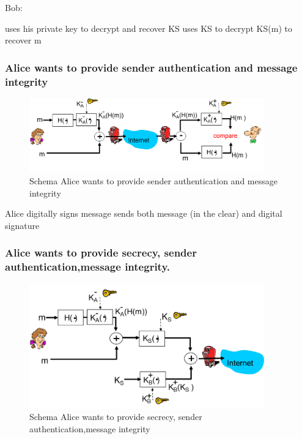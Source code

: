 \noindent Bob:

\bi
\itf uses his private key to decrypt and recover KS
\itf uses KS to decrypt KS(m) to recover m
\ei

\newpage

\subsubsection{Alice wants to provide sender authentication and message integrity}

\begin{figure}[h]
    \centering
    \includegraphics[width=4in]{./img/imghfdst8/hfdst8puntje24.png}
    \caption{Schema Alice wants to provide sender authentication and message integrity }      
    \label{fig:Schema Alice wants to provide sender authentication and message integrity }
\end{figure}

\bi
\itf Alice digitally signs message
\itf sends both message (in the clear) and digital signature
\ei

\subsubsection{Alice wants to provide secrecy, sender authentication,message integrity.}

\begin{figure}[h]
    \centering
    \includegraphics[width=4in]{./img/imghfdst8/hfdst8puntje25.png}
    \caption{Schema Alice wants to provide secrecy, sender authentication,message integrity }      
    \label{fig:Schema Alice wants to provide secrecy, sender authentication,message integrity }
\end{figure}


